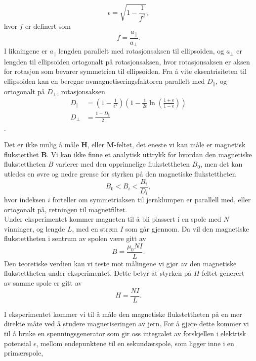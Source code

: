 \documentclass[%
 reprint,
 amsmath,amssymb,
 aps,
 norsk,
]{revtex4-1}
\begin{document}
\begin{equation}
  \epsilon = \sqrt{1-\frac{1}{f^2}},\label{eksent}
\end{equation}
hvor $f$ er definert som
\begin{equation*}
  f = \frac{a_{\parallel}}{a_{\perp}}.
\end{equation*}
I likningene er $a_{\parallel}$ lengden parallelt med rotasjonsaksen til ellipsoiden, og $a_{\perp}$ er lengden til ellipsoiden ortogonalt på rotasjonsaksen, hvor rotasjonsaksen er aksen for rotasjon som bevarer symmetrien til ellipsoiden. Fra å vite eksentrisiteten til ellipsoiden kan en beregne avmagnetiseringsfaktoren parallelt med $D_{\parallel}$, og ortogonalt på $D_{\perp}$, rotasjonsaksen
\begin{align*}
  D_{\parallel} &= \left(1-\frac{1}{\epsilon^2}\right)\left(1-\frac{1}{2\epsilon}\ln{\left(\frac{1+\epsilon}{1-\epsilon}\right)} \right) \\
  D_{\perp} &= \frac{1-D_{\parallel}}{2}
\end{align*}.
\par
Det er ikke mulig å måle $\bm{H}$, eller $\bm{M}$-feltet, det eneste vi kan måle er magnetisk flukstetthet $\bm{B}$. Vi kan ikke finne et analytisk uttrykk for hvordan den magnetiske flukstettheten $B$ varierer med den opprinnelige flukstettheten $B_0$, men det kan utledes en øvre og nedre grense for styrken på den magnetiske flukstettheten
\begin{equation}
  B_0 < B_i < \frac{B_i}{D_i}, \label{upper_limit}
\end{equation}
hvor indeksen $i$ forteller om symmetriaksen til jernklumpen er parallell med, eller ortogonalt på, retningen til magnetfiltet.
\\Under eksperimentet kommer magneten til å bli plassert i en spole med $N$ vinninger, og lengde $L$, med en strøm $I$ som går gjennom. Da vil den magnetiske flukstettheten i sentrum av spolen være gitt av
\begin{equation}
  B = \frac{\mu_0NI}{L}. \label{nice_b}
\end{equation}Den teoretiske verdien kan vi teste mot målingene vi gjør av den magnetiske flukstettheten under eksperimentet. Dette betyr at styrken på $H$-feltet generert av samme spole er gitt av
\begin{equation}
  H = \frac{NI}{L}. \label{nice_H}
\end{equation}
\par
I eksperimentet kommer vi til å måle den magnetiske flukstettheten på en mer direkte måte ved å studere magnetiseringen av jern. For å gjøre dette kommer vi til å bruke en spenningsgenerator som gir oss integralet av forskjellen i elektrisk potensial $\epsilon$, mellom endepunktene til en sekundærspole, som ligger inne i en primærspole,
\end{document}
